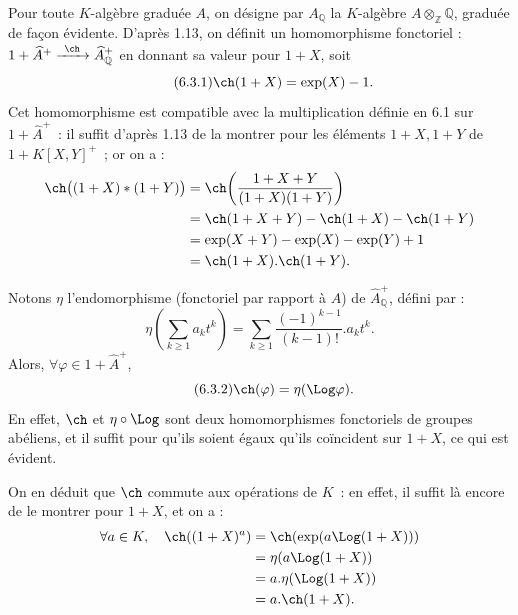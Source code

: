 Pour toute \(K\)-algèbre graduée \(A\), on désigne par \(A_{\mathbb Q}\) la \(K\)-algèbre \(A\otimes_{\mathbb Z}\mathbb Q\), graduée de façon évidente. D'après 1.13, on définit un homomorphisme fonctoriel : \(1+\widehat A^+\xrightarrow{\ \ch\ }\widehat A_{\mathbb Q}^{+}\) en donnant sa valeur pour \(1+X\), soit
\begin{equation}\tag{6.3.1}
  \ch(1+X)=\exp(X)-1.
\end{equation}
Cet homomorphisme est compatible avec la multiplication définie en 6.1 sur \(1+\widehat A^+\)~: il suffit d'après 1.13 de la montrer pour les éléments \(1+X,1+Y\) de \(1+K[X,Y]^+\)~; or on a :
\[
\begin{aligned}
 \ch\bigl((1+X)*(1+Y)\bigr)
 &= \ch\!\left(\frac{1+X+Y}{(1+X)(1+Y)}\right)\\
 &= \ch(1+X+Y)-\ch(1+X)-\ch(1+Y)\\
 &= \exp(X+Y)-\exp(X)-\exp(Y)+1\\
 &= \ch(1+X).\ch(1+Y).
\end{aligned}
\]

Notons \(\eta\) l'endomorphisme (fonctoriel par rapport à \(A\)) de \(\widehat A_{\mathbb Q}^{+}\), défini par :
\[
 \eta\!\left(\sum_{k\ge1} a_k t^k\right)
 =
 \sum_{k\ge1}\frac{(-1)^{k-1}}{(k-1)!}.a_k t^k.
\]
Alors, \(\forall\varphi\in1+\widehat A^+\),
\begin{equation}\tag{6.3.2}
  \ch(\varphi)=\eta(\Log\varphi).
\end{equation}
En effet, \(\ch\) et \(\eta\circ\Log\) sont deux homomorphismes fonctoriels de groupes abéliens, et il suffit pour qu'ils soient égaux qu'ils coïncident sur \(1+X\), ce qui est évident.

On en déduit que \(\ch\) commute aux opérations de \(K\)~: en effet, il suffit là encore de le montrer pour \(1+X\), et on a :
\[
\begin{aligned}
 \forall a\in K,\quad\ch((1+X)^a)
 &=\ch(\exp(a\Log(1+X)))\\
 &=\eta(a\Log(1+X))\\
 &=a.\eta(\Log(1+X))\\
 &=a.\ch(1+X).
\end{aligned}
\]
